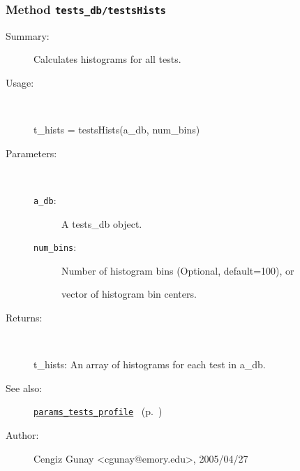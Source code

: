 \subsubsection[Method \texttt{testsHists}]{Method \texttt{tests\_db/testsHists}}%
%
\label{ref_tests_db__testsHists}%
\hypertarget{ref_tests_db__testsHists}{}%
\begin{description}
\item[Summary:]Calculates histograms for all tests.
%
\item[Usage:]~%
\begin{lyxcode}%
t\_hists = testsHists(a\_db, num\_bins)
%
\end{lyxcode}%
%
%
\item[Parameters:]~
\begin{description}%
\item[\texttt{a\_db}:]
 A tests\_db object.
\item[\texttt{num\_bins}:]
 Number of histogram bins (Optional, default=100), or

vector of histogram bin centers.
\end{description}%
%
\item[Returns:
]~

	t\_hists: An array of histograms for each test in a\_db.
%
%
\item[See also:]%
\hyperlink{ref_params_tests_profile}{\texttt{params\_tests\_profile}}%
\ (p.~\pageref{ref_params_tests_profile})%
%
%
\item[Author:]%
Cengiz Gunay <cgunay@emory.edu>, 2005/04/27
%
\end{description}
\methodline%
